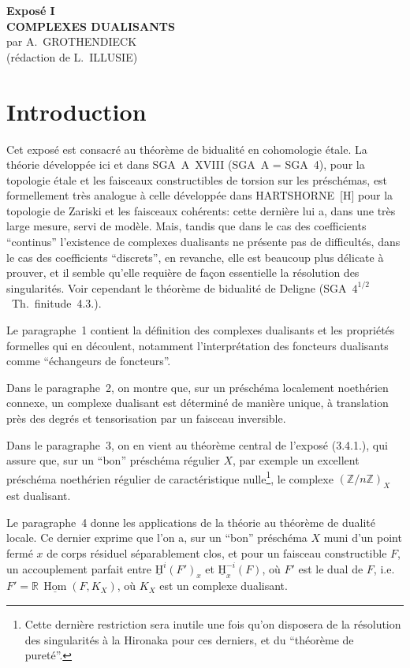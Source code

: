 \documentclass[11pt]{article}
\renewcommand{\H}{\mathrm{H}}
\DeclareMathOperator{\Hom}{Hom}
\newcommand{\R}{\mathbb{R}}\newcommand{\RHomCore}{\mathbb{R}\mathrm{Hom}}
\newcommand{\Z}{\mathbb{Z}}
\providecommand{\Hom}{\operatorname{Hom}}
\providecommand{\R}{\mathrm R}
\providecommand{\Z}{\mathbb Z}
\providecommand{\Hom}{\operatorname{Hom}}
\begin{document}
\begin{center}
{\Large \textbf{Exposé I}}\\[0.4em]
{\large \textbf{COMPLEXES DUALISANTS}}\\[0.3em]
par A.~GROTHENDIECK\\
(rédaction de L.~ILLUSIE)
\end{center}

\section*{Introduction}

Cet exposé est consacré au théorème de bidualité en cohomologie étale. La théorie développée ici et dans SGA~A~XVIII (SGA~A = SGA~4), pour la topologie étale et les faisceaux constructibles de torsion sur les préschémas, est formellement très analogue à celle développée dans HARTSHORNE~[H] pour la topologie de Zariski et les faisceaux cohérents: cette dernière lui a, dans une très large mesure, servi de modèle. Mais, tandis que dans le cas des coefficients ``continus'' l'existence de complexes dualisants ne présente pas de difficultés, dans le cas des coefficients ``discrets'', en revanche, elle est beaucoup plus délicate à prouver, et il semble qu'elle requière de façon essentielle la résolution des singularités. Voir cependant le théorème de bidualité de Deligne (SGA~$4^{1/2}$~Th.~finitude~4.3.).

Le paragraphe~1 contient la définition des complexes dualisants et les propriétés formelles qui en découlent, notamment l'interprétation des foncteurs dualisants comme ``échangeurs de foncteurs''.

Dans le paragraphe~2, on montre que, sur un préschéma localement noethérien connexe, un complexe dualisant est déterminé de manière unique, à translation près des degrés et tensorisation par un faisceau inversible.

Dans le paragraphe~3, on en vient au théorème central de l'exposé (3.4.1.), qui assure que, sur un ``bon'' préschéma régulier $X$, par exemple un excellent préschéma noethérien régulier de caractéristique nulle\footnote{Cette dernière restriction sera inutile une fois qu'on disposera de la résolution des singularités à la Hironaka pour ces derniers, et du ``théorème de pureté''.}, le complexe $(\Z/n\Z)_X$ est dualisant.

Le paragraphe~4 donne les applications de la théorie au théorème de dualité locale. Ce dernier exprime que l'on a, sur un ``bon'' préschéma $X$ muni d'un point fermé $x$ de corps résiduel séparablement clos, et pour un faisceau constructible $F$, un accouplement parfait entre $\underline{\H}^i(F')_x$ et $\underline{\H}^{-i}_x(F)$, où $F'$ est le dual de $F$, i.e.\ $F' = \R\,\underline{\Hom}(F,K_X)$, où $K_X$ est un complexe dualisant.
\end{document}

